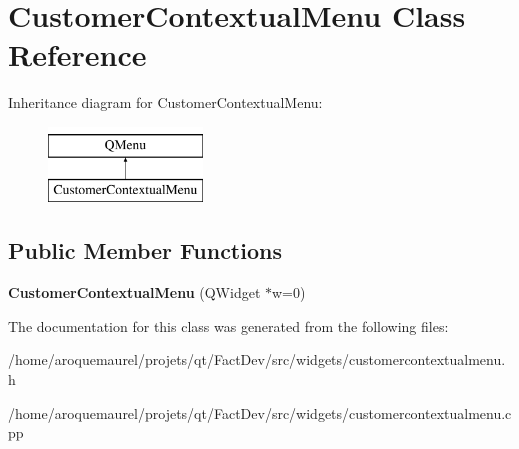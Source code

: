 \hypertarget{classCustomerContextualMenu}{\section{Customer\-Contextual\-Menu Class Reference}
\label{classCustomerContextualMenu}
}
Inheritance diagram for Customer\-Contextual\-Menu\-:\begin{figure}[H]
\begin{center}
\leavevmode
\includegraphics[height=2.000000cm]{d5/db9/classCustomerContextualMenu}
\end{center}
\end{figure}
\subsection*{Public Member Functions}
\begin{DoxyCompactItemize}
\item 
\hypertarget{classCustomerContextualMenu_a798a08f4b8526398a54752e7de87930e}{{\bfseries Customer\-Contextual\-Menu} (Q\-Widget $\ast$w=0)}\label{classCustomerContextualMenu_a798a08f4b8526398a54752e7de87930e}

\end{DoxyCompactItemize}


The documentation for this class was generated from the following files\-:\begin{DoxyCompactItemize}
\item 
/home/aroquemaurel/projets/qt/\-Fact\-Dev/src/widgets/customercontextualmenu.\-h\item 
/home/aroquemaurel/projets/qt/\-Fact\-Dev/src/widgets/customercontextualmenu.\-cpp\end{DoxyCompactItemize}
